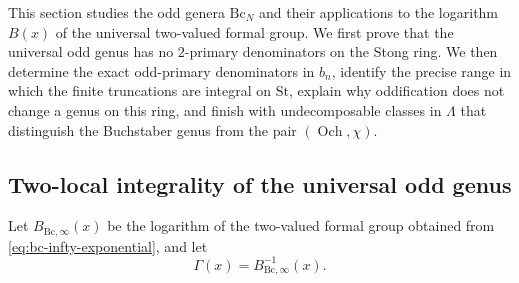 \documentclass[14pt,dvipsnames]{extarticle}
\numberwithin{equation}{subsection}
\theoremstyle{plain}
\theoremstyle{definition}
\theoremstyle{definition}
\DeclareMathOperator{\Och}{Och}
\newcommand{\Bc}{\mathrm{Bc}}
\newcommand{\St}{\mathrm{St}}
\begin{document}
This section studies the odd genera $\Bc_N$ and their applications to the
logarithm $B(x)$ of the universal two-valued formal group. We first prove that
the universal odd genus has no $2$-primary denominators on the Stong ring. We
then determine the exact odd-primary denominators in $b_n$, identify the
precise range in which the finite truncations are integral on $\St$, explain
why oddification does not change a genus on this ring, and finish with
undecomposable classes in $\Lambda$ that distinguish the Buchstaber genus
from the pair $(\Och,\chi)$.

\subsection{Two-local integrality of the universal odd genus}
\label{sec:two-local-integrality}

Let $B_{\Bc,\infty}(x)$ be the logarithm of the two-valued formal group obtained
from \eqref{eq:bc-infty-exponential}, and let
\[
 \Gamma(x)=B_{\Bc,\infty}^{-1}(x).
\]
\end{document}
